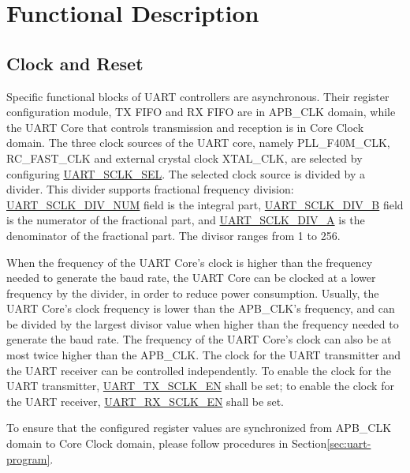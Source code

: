 \documentclass[main\_\_EN.tex]{subfiles}
\begin{document}
\section{Functional Description}

\subsection{Clock and Reset}

Specific functional blocks of UART controllers are asynchronous. Their register configuration module, TX FIFO and RX FIFO are in APB\_CLK domain, while the UART Core that controls transmission and reception is in Core Clock domain. The three clock sources of the UART core, namely PLL\_F40M\_CLK, RC\_FAST\_CLK and external crystal clock XTAL\_CLK, are selected by configuring \hyperref[fielddesc:UARTSCLKSEL]{UART\_SCLK\_SEL}. The selected clock source is divided by a divider. This divider supports fractional frequency division: \hyperref[fielddesc:UARTSCLKDIVNUM]{UART\_SCLK\_DIV\_NUM} field is the integral part,  \hyperref[fielddesc:UARTSCLKDIVB]{UART\_SCLK\_DIV\_B} field is the numerator of the fractional part, and \hyperref[fielddesc:UARTSCLKDIVA]{UART\_SCLK\_DIV\_A} is the denominator of the fractional part. The divisor ranges from 1 to 256.



When the frequency of the UART Core's clock is higher than the frequency needed to generate the baud rate, the UART Core can be clocked at a lower frequency by the divider, in order to reduce power consumption. Usually, the UART Core's clock frequency is lower than the APB\_CLK's frequency, and can be divided by the largest divisor value when higher than the frequency needed to generate the baud rate. The frequency of the UART Core's clock can also be at most twice higher than the APB\_CLK. The clock for the UART transmitter and the UART receiver can be controlled independently. To enable the clock for the UART transmitter, \hyperref[fielddesc:UARTTXSCLKEN]{UART\_TX\_SCLK\_EN} shall be set; to enable the clock for the UART receiver, \hyperref[fielddesc:UARTRXSCLKEN]{UART\_RX\_SCLK\_EN} shall be set.

To ensure that the configured register values are synchronized from APB\_CLK domain to Core Clock domain, please follow procedures in Section\ref{sec:uart-program}.
\end{document}
